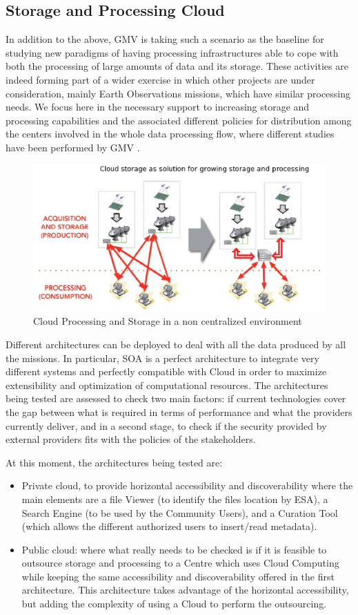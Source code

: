 \subsection{Storage and Processing Cloud}
In addition to the above, GMV is taking such a scenario as the baseline for studying  new paradigms of having processing infrastructures  able to cope with both the processing of large amounts of data and its storage. These activities  are indeed forming part of a wider exercise in which other projects are under consideration, mainly Earth Observations missions, which have similar processing needs. We focus here in the necessary support to increasing storage and processing capabilities and the associated different policies for distribution among the centers involved in the whole data processing flow, where different studies have been performed by GMV \citep{RubenPerez1}.
\begin{figure}[h]
\centering
\includegraphics[width=80 mm]{part10/Perez_P022/P022_f3.eps}
\caption{Cloud Processing and Storage in a non centralized environment}

\end{figure}
Different architectures can be deployed to deal with all the data produced by all the missions. In particular, SOA is a perfect architecture to integrate very different systems and perfectly compatible with Cloud in order to maximize extensibility and optimization of computational resources. The architectures being tested are assessed to check two main factors: if current technologies cover the gap between what is required in terms of performance and what the providers currently deliver, and in a second stage, to check if the security provided by external providers fits with the policies of the stakeholders.

At this moment, the architectures being tested are:
\begin{itemize}
\item Private cloud, to provide horizontal accessibility and discoverability where the main elements are a file Viewer (to identify the files location by ESA), a Search Engine (to be used by the Community Users), and a Curation Tool (which allows the different authorized users to insert/read metadata).
\item Public cloud: where what really needs to be checked is if it is feasible to outsource storage and processing to a Centre which uses Cloud Computing while keeping the same accessibility and discoverability offered in the first architecture. This architecture takes advantage of the horizontal accessibility, but adding the complexity of using a Cloud to perform the outsourcing.
\end{itemize}


